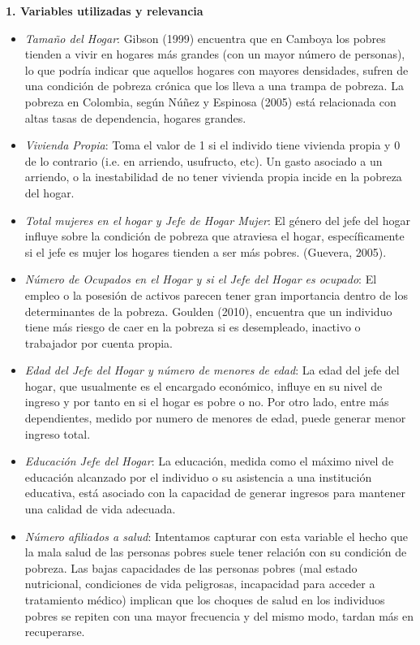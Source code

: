 \documentclass[11pt]{article}
\begin{document}
\justify
\textbf{1. Variables utilizadas y relevancia}
\begin{itemize}
\item \emph{Tamaño del Hogar}: Gibson (1999) encuentra que en Camboya los pobres tienden a vivir en hogares más grandes (con un mayor número de personas), lo que podría indicar que aquellos hogares con mayores densidades, sufren de una condición de pobreza crónica que los lleva a una trampa de pobreza. La pobreza en Colombia, según Núñez y Espinosa (2005) está relacionada con altas tasas de dependencia, hogares grandes.
\item \emph{Vivienda Propia}: Toma el valor de 1 si el individo tiene vivienda propia y 0 de lo contrario (i.e. en arriendo, usufructo, etc). Un gasto asociado a un arriendo, o la inestabilidad de no tener vivienda propia incide en la pobreza del hogar. 
\item \emph{Total mujeres en el hogar y Jefe de Hogar Mujer}: El género del jefe del hogar influye sobre la condición de pobreza que atraviesa el hogar, específicamente si el jefe es mujer los hogares tienden a ser más pobres. (Guevera, 2005).
\item \emph{Número de Ocupados en el Hogar y si el Jefe del Hogar es ocupado}: El empleo o la posesión de activos parecen tener gran importancia dentro de los determinantes de la pobreza. Goulden (2010), encuentra que un individuo tiene más riesgo de caer en la pobreza si es desempleado, inactivo o trabajador por cuenta propia.
\item \emph{Edad del Jefe del Hogar y número de menores de edad}: La edad del jefe del hogar, que usualmente es el encargado económico, influye en su nivel de ingreso y por tanto en si el hogar es pobre o no. Por otro lado, entre más dependientes, medido por numero de menores de edad, puede generar menor ingreso total. 
\item \emph{Educación Jefe del Hogar}: La educación, medida como el máximo nivel de educación alcanzado por el individuo o su asistencia a una institución educativa,  está asociado con la capacidad de generar ingresos para mantener una calidad de vida adecuada.
\item \emph{Número afiliados a salud}: Intentamos capturar con esta variable el hecho que la mala salud de las personas pobres suele tener relación con su condición de pobreza. Las bajas capacidades de las personas pobres (mal estado nutricional, condiciones de vida peligrosas, incapacidad para acceder a tratamiento médico) implican que los choques de salud en los individuos pobres se repiten con una mayor frecuencia y del mismo modo, tardan más en recuperarse.

\end{itemize}
\end{document}
